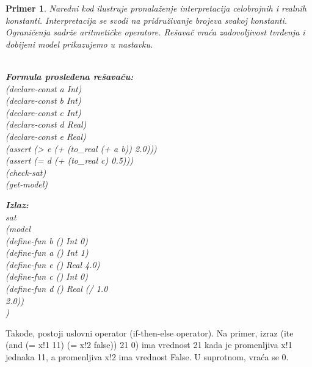 \documentclass[12pt,oneside]{memoir}
\newcommand\tab[1][0.5cm]{\hspace*{#1}}
\newtheorem{primer}{Primer}
\begin{document}
\begin{primer} Naredni kod ilustruje pronalaženje interpretacija celobrojnih i realnih konstanti. Interpretacija se svodi na pridruživanje brojeva svakoj konstanti. Ograničenja sadrže aritmetičke operatore. Rešavač vraća zadovoljivost tvrđenja i dobijeni model prikazujemo u nastavku.\\ \\
\begin{minipage}[b]{0.47\textwidth}
\textbf{Formula prosleđena rešavaču:}
\\(declare-const a Int)
\\(declare-const b Int)
\\(declare-const c Int)
\\(declare-const d Real)
\\(declare-const e Real)
\\(assert (> e (+ (to\_real (+ a b)) 2.0)))
\\(assert (= d (+ (to\_real c) 0.5)))
\\(check-sat)
\\(get-model)
\end{minipage}
\hspace{1.6cm}
\begin{minipage}[t]{0.4\textwidth}
\vspace{-6cm}
\textbf{Izlaz:}
\\sat 
\\(model
\\\tab(define-fun b () Int 0) 
\\\tab(define-fun a () Int 1) 
\\\tab(define-fun e () Real 4.0) 
\\\tab(define-fun c () Int 0) 
\\\tab(define-fun d () Real (/ 1.0 
\\\tab 2.0))
\\)
\end{minipage}

\end{primer}


Takođe, postoji uslovni operator (if-then-else operator). Na primer,
izraz (ite (and (= x!1 11) (= x!2 false)) 21 0) ima vrednost 21 kada je promenljiva x!1 jednaka 11, a promenljiva x!2 ima vrednost False. U suprotnom, vraća se 0.
\end{document}
